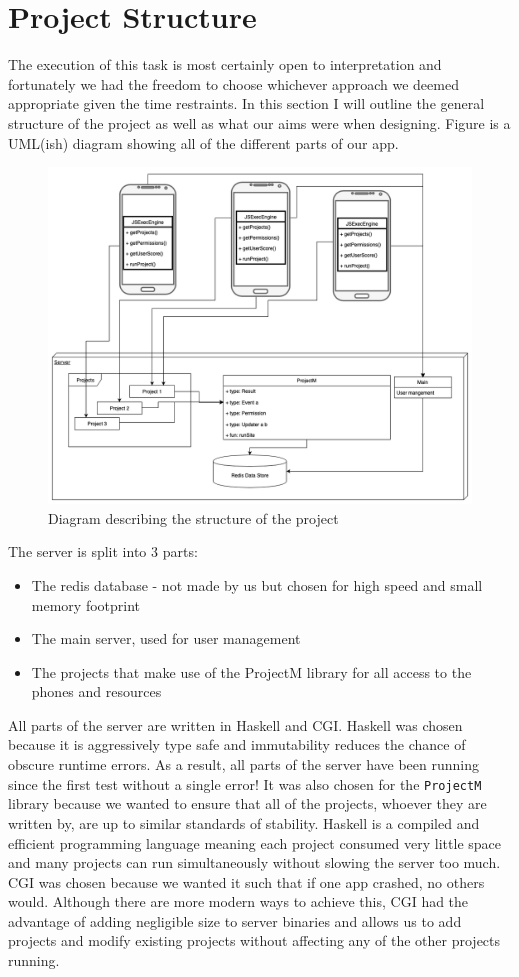 \documentclass{article}
\begin{document}
\section{Project Structure}
The execution of this task is most certainly open to interpretation and fortunately we had the freedom to choose whichever
approach we deemed appropriate given the time restraints. In this section I will outline the general structure of the project as well
as what our aims were when designing. Figure is a UML(ish) diagram showing all of the different parts of our app.
\begin{figure}[h]
  \caption{Diagram describing the structure of the project}
  \centering
  \includegraphics[width=1\textwidth]{DocFiles/ProjectM}
\end{figure}

The server is split into 3 parts: 
\begin{itemize}
  \item{The redis database - not made by us but chosen for high speed and small memory footprint} 
  \item{The main server, used for user management} 
  \item{The projects that make use of the ProjectM library for all access to the phones and resources}
\end{itemize}
All parts of the server are written in Haskell and CGI. Haskell was chosen because it is aggressively type safe and immutability reduces the
chance of obscure runtime errors. As a result, all parts of the server have been running since the first test without a single error! It
was also chosen for the \texttt{ProjectM} library because we wanted to ensure that all of the projects, whoever they are written by,
are up to similar standards of stability. Haskell is a compiled and efficient programming language meaning each project consumed very little space
and many projects can run simultaneously without slowing the server too much. CGI was chosen because we wanted it such that if one app crashed, no others would.
Although there are more modern ways to achieve this, CGI had the advantage of adding negligible size to server binaries and
allows us to add projects and modify existing projects without affecting any of the other projects running.
\end{document}
